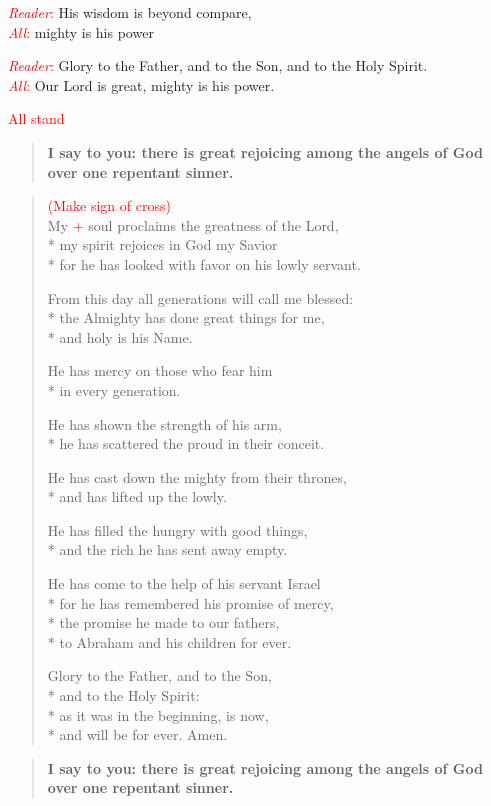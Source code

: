 \documentclass[letterpaper,14pt]{extarticle}
\newcommand{\side}[1]{\flagverse{\textcolor{red}{\textit{#1}}:}}
\newcommand{\sidestar}[1]{\textcolor{red}{\textit{#1}:}}
\newcommand{\rednote}[1]{\textcolor{red}{#1}}
\newlength{\oldindent}
\newcommand{\antiphon}[2]{
	\setlength{\oldindent}{\vindent}
	\setlength{\vindent}{0em}
	\begin{verse}
	\side{#1} \textbf{#2}
	\end{verse}
	\setlength{\vindent}{\oldindent}
}
\begin{document}
\sidestar{Reader} His wisdom is beyond compare, \\
\sidestar{All} mighty is his power

\sidestar{Reader} Glory to the Father, and to the Son, and to the Holy Spirit. \\
\sidestar{All} Our Lord is great, mighty is his power.

\rednote{All stand}
\antiphon{Leader}{\small{I say to you: there is great rejoicing among the angels of God over one repentant sinner.}}
\setlength{\stanzaskip}{0.25\baselineskip}
\begin{verse}
\rednote{(Make sign of cross)}\\
\side{All} My \rednote{+} soul proclaims the greatness of the Lord, \\*
my spirit rejoices in God my Savior \\*
for he has looked with favor on his lowly servant.

From this day all generations will call me blessed: \\*
the Almighty has done great things for me, \\*
and holy is his Name.

He has mercy on those who fear him \\*
in every generation.

He has shown the strength of his arm, \\*
he has scattered the proud in their conceit.

He has cast down the mighty from their thrones, \\*
and has lifted up the lowly.

He has filled the hungry with good things, \\*
and the rich he has sent away empty.

He has come to the help of his servant Israel \\*
for he has remembered his promise of mercy, \\*
the promise he made to our fathers, \\*
to Abraham and his children for ever.

Glory to the Father, and to the Son, \\*
and to the Holy Spirit: \\*
as it was in the beginning, is now, \\*
and will be for ever. Amen.
\end{verse}
\setlength{\stanzaskip}{0.75\baselineskip}
\antiphon{All}{\small{I say to you: there is great rejoicing among the angels of God over one repentant sinner.}}
\end{document}
